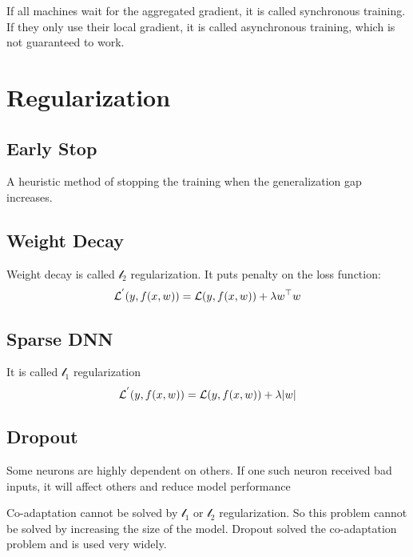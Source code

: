 If all machines wait for the aggregated gradient, it is called synchronous training. If they only use their local gradient, it is called asynchronous training, which is not guaranteed to work. 


\section{Regularization}

\subsection{Early Stop}

A heuristic method of stopping the training when the generalization gap increases.

\subsection{Weight Decay}

Weight decay is called $\mathcal{l}_2$ regularization. It puts penalty on the loss function:
\begin{equation}
    \mathcal{L}^{'}(y, f(x,w)) = \mathcal{L}(y, f(x,w)) + \lambda {w}^\top w
\end{equation}

\subsection{Sparse DNN}
It is called $\mathcal{l}_1$ regularization
\begin{equation}
    \mathcal{L}^{'}(y, f(x,w)) = \mathcal{L}(y, f(x,w)) + \lambda \abs{w}
\end{equation}

\subsection{Dropout}

\begin{definition}[Co-adaptation]
    Some neurons are highly dependent on others. If one such neuron received bad inputs, it will affect others and reduce model performance    
\end{definition}

Co-adaptation cannot be solved by $\mathcal{l}_1$ or $\mathcal{l}_2$ regularization. So this problem cannot be solved by increasing the size of the model. Dropout solved the co-adaptation problem and is used very widely.

